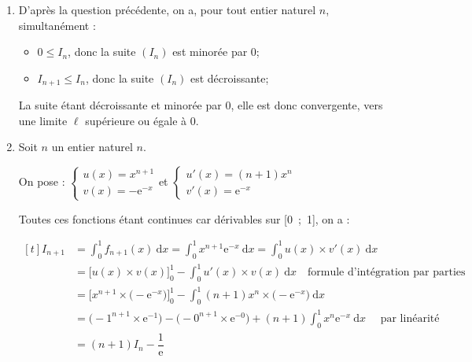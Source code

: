\documentclass[10pt]{article}
\providecommand{\e}{{\mathrm{e}}}
\begin{document}
\begin{enumerate}
\begin{enumerate}
Comme on intègre entre 0 et 1, avec $0 < 1$, par positivité de l'intégrale, on en déduit :

$\displaystyle \int_{0}^{1} 0 ~\mathrm{d}x \leqslant \int_{0}^{1} f_{n+1}(x)~\mathrm{d}x \leqslant \int_{0}^{1}f_n(x)~\mathrm{d}x$\quad soit \quad $0 \leqslant I_{n+1} \leqslant I_n$.
	\end{enumerate}

	\item D'après la question précédente, on a, pour tout entier naturel $n$, simultanément :
	\begin{itemize}
		\item $0 \leqslant I_n$, \quad donc la suite $(I_n)$ est minorée par 0;
		\item $I_{n+1} \leqslant I_n$, \quad donc la suite $(I_n)$ est décroissante;
	\end{itemize}

La suite étant décroissante et minorée par 0, elle est donc convergente, vers une limite $\ell$ supérieure ou égale à 0.

	\item Soit $n$ un entier naturel $n$.

On pose : \quad $\begin{cases}
u(x) = x^{n+1} \\
v(x) = -\e^{-x}
\end{cases}$\quad et \quad $\begin{cases}
u'(x) = (n+1) x^{n} \\
v'(x) = \e^{-x}
\end{cases}$

Toutes ces fonctions étant continues car dérivables sur [0~;~1], on a :

$\begin{aligned}[t] \displaystyle
I_{n+1} &= \int_{0}^{1} f_{n+1}(x) ~\mathrm{d}x
		= \int_{0}^{1} x^{n+1}\e^{-x} ~\mathrm{d}x
		= \int_{0}^{1} u(x)\times v'(x) ~\mathrm{d}x\\
		&= \Big[u(x) \times v(x) \Big]_0^1 - \int_{0}^{1} u'(x)\times v(x) ~\mathrm{d}x\quad \text{formule d'intégration par parties}\\
		&= \Big[x^{n+1} \times \big(-\e^{-x}\big)\Big]_0^1 - \int_{0}^{1} (n+1)x^{n} \times \big(-\e^{-x}\big)~\mathrm{d}x	\\
		&=\big(-1^{n+1}\times \e^{-1}\big) - \big(-0^{n+1}\times \e^{-0}\big) +(n+1)\int_{0}^{1} x^{n} \e^{-x}~\mathrm{d}x\quad\text{ par linéarité}\\
		&=(n+1)I_n - \dfrac{1}{\e}
\end{aligned}$


\end{enumerate}
\end{document}

